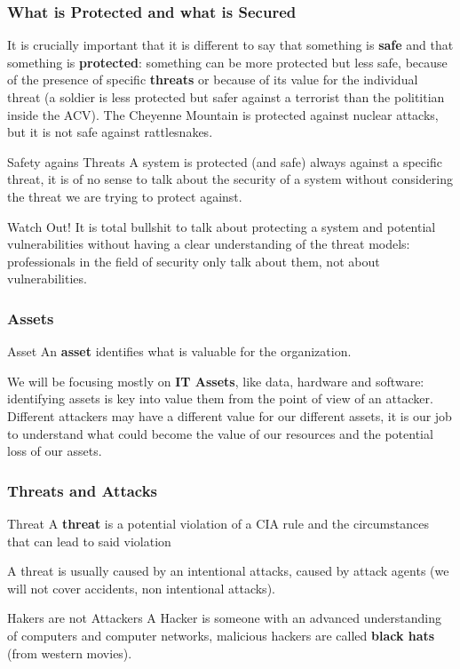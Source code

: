 \subsubsection{What is Protected and what is Secured}
It is crucially important that it is different to say that something is 
\textbf{safe} and that something is \textbf{protected}: something can be 
more protected but less safe, because of the presence of specific 
\textbf{threats} or because of its value for the individual threat (a 
soldier is less protected but safer against a terrorist than the polititian 
inside the ACV). The Cheyenne Mountain is protected against nuclear attacks,
but it is not safe against rattlesnakes.
\begin{key}{Safety agains Threats}
    A system is protected (and safe) always against a specific threat,
    it is of no sense to talk about the security of a system without
    considering the threat we are trying to protect against.
\end{key}
\begin{warning}{Watch Out!}
    It is total bullshit to talk about protecting a system and potential 
    vulnerabilities without having a clear understanding of the threat models: 
    professionals in the field of security only talk about them, 
    not about vulnerabilities.
\end{warning}

\subsubsection{Assets}
\begin{key}{Asset}
    An \textbf{asset} identifies what is valuable for the organization.
\end{key}
We will be focusing mostly on \textbf{IT Assets}, like data, hardware and 
software: identifying assets is key into value them from the point of view
of an attacker. Different attackers may have a different value for our 
different assets, it is our job to understand what could become the value 
of our resources and the potential loss of our assets.

\subsubsection{Threats and Attacks}
\begin{key}{Threat}
    A \textbf{threat} is a potential violation of a CIA rule and the 
    circumstances that can lead to said violation
\end{key}
A threat is usually caused by an intentional attacks, caused by attack agents
(we will not cover accidents, non intentional attacks).
\begin{warning}{Hakers are not Attackers}
    A Hacker is someone with an advanced understanding of computers and computer
    networks, malicious hackers are called \textbf{black hats} 
    (from western movies).
\end{warning}

